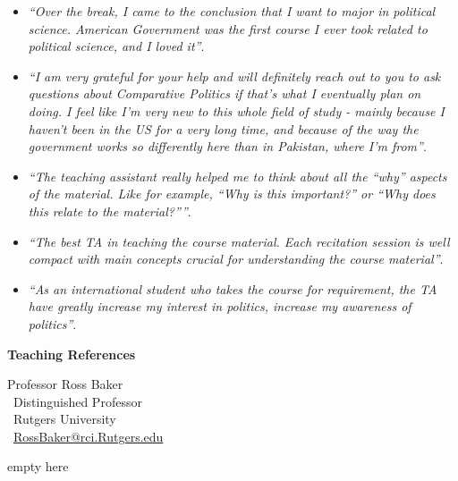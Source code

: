 \documentclass[11pt]{letter} %
\begin{document}
\begin{letter}{}
{\begin{itemize}
\item \emph{``Over the break, I came to the conclusion that I want to major in political science. American Government was the first course I ever took related to political science, and I loved it''}.

\item \emph{``I am very grateful for your help and will definitely reach out to you to ask questions about Comparative Politics if that's what I eventually plan on doing. I feel like I'm very new to this whole field of study - mainly because I haven't been in the US for a very long time, and because of the way the government works so differently here than in Pakistan, where I'm from''}.

\item \emph{``The teaching assistant really helped me to think about all the ``why'' aspects of the material. Like for example, ``Why is this important?'' or ``Why does this relate to the material?''''}.

\item \emph{``The best TA in teaching the course material. Each recitation session is well compact with main concepts crucial for understanding the course material''}.

\item \emph{``As an international student who takes the course for requirement, the TA have greatly increase my interest in politics, increase my awareness of politics''}.

\end{itemize}


}{\bf Teaching References}

Professor Ross Baker\\\
Distinguished Professor\\\
Rutgers University\\\
\href{mailto:rosbaker@rci.rutgers.edu}{RossBaker@rci.Rutgers.edu} 



\closing{{\color{white}empty here}}




\end{letter}
\end{document}

